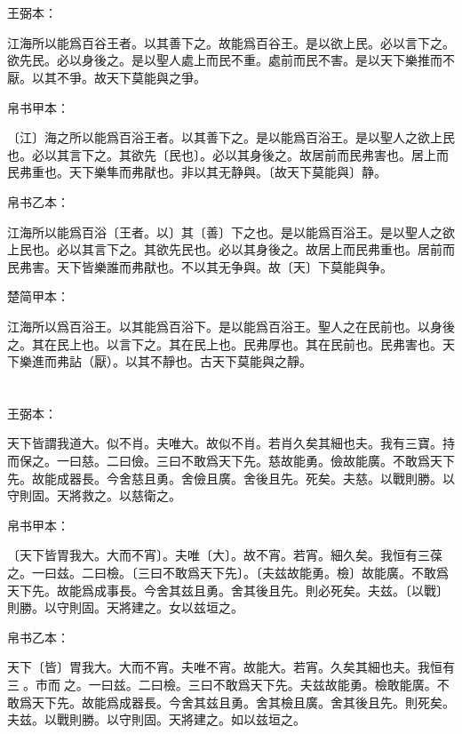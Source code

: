\documentclass[a5paper]{ctexbook}
\begin{document}
    \chapter{}
    王弼本：

    江海所以能爲百谷王者。以其善下之。故能爲百谷王。是以欲上民。必以言下之。欲先民。必以身後之。是以聖人處上而民不重。處前而民不害。是以天下樂推而不厭。以其不爭。故天下莫能與之爭。

    
    帛书甲本：

    〔江〕海之所以能爲百浴王者。以其善下之。是以能爲百浴王。是以聖人之欲上民也。必以其言下之。其欲先〔民也〕。必以其身後之。故居前而民弗害也。居上而民弗重也。天下樂隼而弗猒也。非以其无静與。〔故天下莫能與〕静。

    帛书乙本：

    江海所以能爲百浴〔王者。以〕其〔善〕下之也。是以能爲百浴王。是以聖人之欲上民也。必以其言下之。其欲先民也。必以其身後之。故居上而民弗重也。居前而民弗害。天下皆樂誰而弗猒也。不以其无争與。故〔天〕下莫能與争。

    楚简甲本：

    江海所以爲百浴王。以其能爲百浴下。是以能爲百浴王。聖人之在民前也。以身後之。其在民上也。以言下之。其在民上也。民弗厚也。其在民前也。民弗害也。天下樂進而弗詀（厭）。以其不靜也。古天下莫能與之靜。

    \chapter{}
    王弼本：

    天下皆謂我道大。似不肖。夫唯大。故似不肖。若肖久矣其細也夫。我有三寶。持而保之。一曰慈。二曰儉。三曰不敢爲天下先。慈故能勇。儉故能廣。不敢爲天下先。故能成器長。今舍慈且勇。舍儉且廣。舍後且先。死矣。夫慈。以戰則勝。以守則固。天將救之。以慈衛之。

    
    帛书甲本：

    〔天下皆胃我大。大而不宵〕。夫唯〔大〕。故不宵。若宵。細久矣。我恒有三葆之。一曰兹。二曰檢。〔三曰不敢爲天下先〕。〔夫兹故能勇。檢〕故能廣。不敢爲天下先。故能爲成事長。今舍其兹且勇。舍其後且先。則必死矣。夫兹。〔以戰〕則勝。以守則固。天將建之。女以兹垣之。

    帛书乙本：

    天下〔皆〕胃我大。大而不宵。夫唯不宵。故能大。若宵。久矣其細也夫。我恒有三𤥯。市而𤥯之。一曰兹。二曰檢。三曰不敢爲天下先。夫兹故能勇。檢敢能廣。不敢爲天下先。故能爲成器長。今舍其兹且勇。舍其檢且廣。舍其後且先。則死矣。夫兹。以戰則勝。以守則固。天將建之。如以兹垣之。
\end{document}
